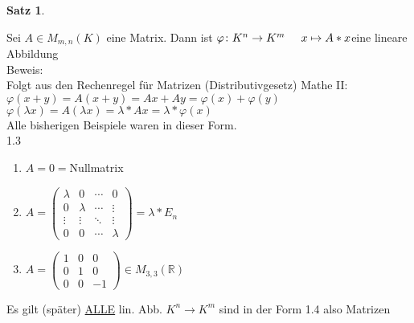 \documentclass[a4paper,11pt]{article}
\newtheorem{satz}[definition]{Satz}
\newcommand{\hsp}{\hspace{5mm}}
\begin{document}
\begin{satz}
\end{satz}
Sei $A\in M_{m,n}(K)$ eine Matrix. Dann ist $\varphi\colon K^n\rightarrow K^m\hsp x\mapsto A*x$\hsp eine lineare Abbildung \\
Beweis: \\
Folgt aus den Rechenregel für Matrizen (Distributivgesetz) Mathe II: \\
$\varphi(x+y)=A(x+y)=Ax+Ay=\varphi(x)+\varphi(y)$ \\
$\varphi(\lambda x)=A(\lambda x)=\lambda *Ax=\lambda*\varphi(x)$ \\ Alle bisherigen Beispiele waren in dieser Form. \\
1.3 
\begin{enumerate}[label=\alph*)]
	\item $A=0=$Nullmatrix
	\item $A=\begin{pmatrix}\lambda&0&\cdots&0\\0&\lambda&\cdots&\vdots\\\vdots&\vdots&\ddots&\vdots\\0&0&\cdots&\lambda\end{pmatrix}=\lambda*E_n$
	\item $A=\begin{pmatrix}1&0&0\\0&1&0\\0&0&-1\end{pmatrix}\in M_{3,3}(\mathbb{R})$
\end{enumerate}
Es gilt (später) \underline{ALLE} lin. Abb. $K^n\rightarrow K^m$ sind in der Form 1.4 also Matrizen

\newpage
\end{document}

